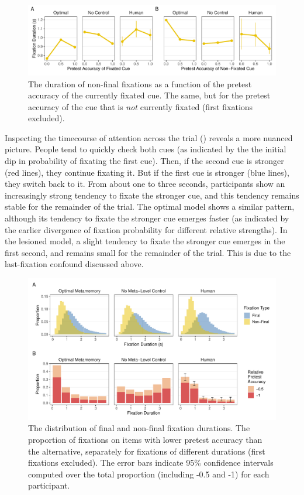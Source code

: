 \begin{figure}[t!]
  \includegraphics[scale=.65]{figs/memory/exp2/nonfinal.pdf}
  \caption{
     The duration of non-final fixations as a function of the pretest accuracy of the currently fixated cue.
     The same, but for the pretest accuracy of the cue that is \emph{not} currently fixated (first fixations excluded).
  \label{fig:nonfinal}
}
\end{figure}


Inspecting the timecourse of attention across the trial () reveals a more nuanced picture. People tend to quickly check both cues (as indicated by the the initial dip in probability of fixating the first cue). Then, if the second cue is stronger (red lines), they continue fixating it. But if the first cue is stronger (blue lines), they switch back to it. From about one to three seconds, participants show an increasingly strong tendency to fixate the stronger cue, and this tendency remains stable for the remainder of the trial. The optimal model shows a similar pattern, although its tendency to fixate the stronger cue emerges faster (as indicated by the earlier divergence of fixation probability for different relative strengths). In the lesioned model, a slight tendency to fixate the stronger cue emerges in the first second, and remains small for the remainder of the trial. This is due to the last-fixation confound discussed above.

\begin{figure}[t!]
  \includegraphics[scale=.65]{figs/memory/exp2/commitment.pdf}
  \caption{
     The distribution of final and non-final fixation durations.
     The proportion of fixations on items with lower pretest accuracy than the alternative, separately for fixations of different durations (first fixations excluded). The error bars indicate 95\% confidence intervals computed over the total proportion (including -0.5 and -1) for each participant.
  \label{fig:commitment}
}
\end{figure}

